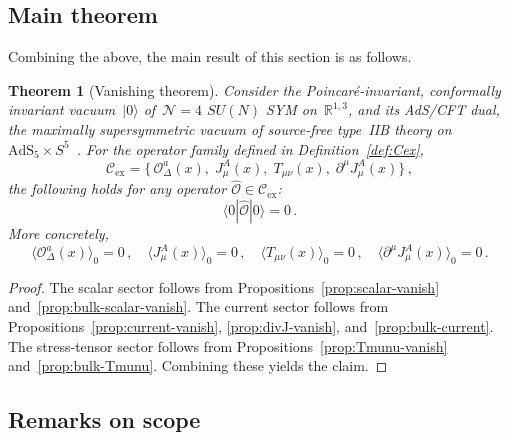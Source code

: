 \documentclass[
  aps,
  prd,
  preprint,
  groupedaddress,
  nofootinbib,
  longbibliography
]{revtex4-2}
\newtheorem{theorem}[definition]{Theorem}
\theoremstyle{remark}
\newcommand{\Cex}{\mathcal{C}_{\mathrm{ex}}}
\newcommand{\N}{\mathcal{N}}
\newcommand{\AdS}{\mathrm{AdS}}
\begin{document}
\subsection{Main theorem}\label{subsec:2-6}

Combining the above, the main result of this section is as follows.

\begin{theorem}[Vanishing theorem]\label{thm:vanishing}
Consider the Poincar\'e-invariant, conformally invariant
vacuum~$|0\rangle$ of~$\N=4$ $SU(N)$ SYM
on~$\mathbb{R}^{1,3}$, and its AdS/CFT dual, the maximally
supersymmetric vacuum of source-free type~IIB theory
on $\AdS_5\times S^5$~\cite{ref1,ref2,ref3,ref4}.
For the operator family defined in Definition~\ref{def:Cex},
\begin{equation}\label{eq:Cex-full}
  \Cex = \bigl\{\,
    \mathcal{O}_\Delta^a(x),\;
    J_\mu^A(x),\;
    T_{\mu\nu}(x),\;
    \partial^\mu J_\mu^A(x)
  \bigr\}\,,
\end{equation}
the following holds for any operator
$\hat{\mathcal{O}}\in\Cex$:
\begin{equation}\label{eq:main-vanishing}
  \langle 0|\hat{\mathcal{O}}|0\rangle = 0\,.
\end{equation}
More concretely,
\begin{equation}\label{eq:vanishing-all}
  \langle\mathcal{O}_\Delta^a(x)\rangle_0 = 0\,,\quad
  \langle J_\mu^A(x)\rangle_0 = 0\,,\quad
  \langle T_{\mu\nu}(x)\rangle_0 = 0\,,\quad
  \langle\partial^\mu J_\mu^A(x)\rangle_0 = 0\,.
\end{equation}
\end{theorem}

\begin{proof}
The scalar sector follows from
Propositions~\ref{prop:scalar-vanish}
and~\ref{prop:bulk-scalar-vanish}.
The current sector follows from
Propositions~\ref{prop:current-vanish},
\ref{prop:divJ-vanish}, and~\ref{prop:bulk-current}.
The stress-tensor sector follows from
Propositions~\ref{prop:Tmunu-vanish}
and~\ref{prop:bulk-Tmunu}.
Combining these yields the claim.
\end{proof}

\subsection{Remarks on scope}\label{subsec:2-7}
\end{document}
